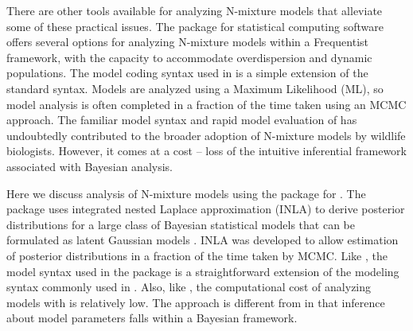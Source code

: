 \documentclass[article]{jss}
\begin{document}
There are other tools available for analyzing N-mixture models that alleviate some of these practical issues.  The  package \citep{Fiske_Chandler_others_2011} for  statistical computing software \citep{R_Core_Team_2016} offers several options for analyzing N-mixture models within a Frequentist framework, with the capacity to accommodate overdispersion and dynamic populations. The model coding syntax used in  is a simple extension of the standard  syntax. Models are analyzed using a Maximum Likelihood (ML), so model analysis is often completed in a fraction of the time taken using an MCMC approach. The familiar model syntax and rapid model evaluation of  has undoubtedly contributed to the broader adoption of N-mixture models by wildlife biologists. However, it comes at a cost -- loss of the intuitive inferential framework associated with Bayesian analysis.

Here we discuss analysis of N-mixture models using the  package \citep{Martins_Simpson_Lindgren_Rue_2013,Rue_Riebler_Sorbye_Illian_Simpson_Lindgren_2017} for . The  package uses integrated nested Laplace approximation (INLA) to derive posterior distributions for a large class of Bayesian statistical models that can be formulated as latent Gaussian models \citep{Rue_Martino_Chopin_2009, Lindgren_Rue_Lindstrom_2011}. INLA was developed to allow estimation of posterior distributions in a fraction of the time taken by MCMC. Like , the model syntax used in the  package is a straightforward extension of the modeling syntax commonly used in . Also, like , the computational cost of analyzing models with  is relatively low. The  approach is different from  in that inference about model parameters falls within a Bayesian framework.
\end{document}
